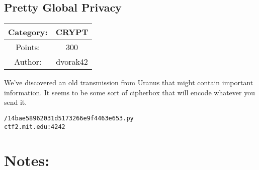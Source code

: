 \begin{center}
\section*{Pretty Global Privacy}
{\large
\begin{tabular}{| c c |}
\hline
Category: & CRYPT\\\hline
Points: & 300\\\hline
Author: & dvorak42\\\hline
\end{tabular}
}
\end{center}
\vspace{0.5in}

{\large
We've discovered an old transmission from Uranus that might contain important information. It seems to be some sort of cipherbox that will encode whatever you send it.
}
\vspace{0.25in}
\begin{center}
  {\Large\tt /14bae58962031d5173266e9f4463e653.py}\\
  {\Large\tt ctf2.mit.edu:4242}
\end{center}

\vspace{0.25in}
\section*{Notes:}
